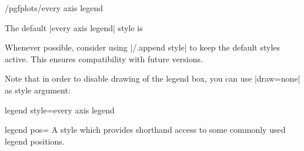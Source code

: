 {\begin{stylekey}{/pgfplots/every axis legend}
\begin{codeexample}[]
\end{codeexample}

    \noindent The default |every axis legend| style is
\begin{codeexample}
\end{codeexample}
    Whenever possible, consider using |/.append style| to keep the default
    styles active. This ensures compatibility with future versions.
\begin{codeexample}
\end{codeexample}

    Note that in order to disable drawing of the legend box, you can use
    |draw=none| as style argument:
\begin{codeexample}[]
\end{codeexample}

\begin{codeexample}[]
\end{codeexample}
\end{stylekey}


\pgfplotsshortstylekey legend style=every axis legend\pgfeov


\begin{pgfplotskey}{legend pos=%
}
    A style which provides shorthand access to some commonly used legend
    positions.


\end{pgfplotskey}}
